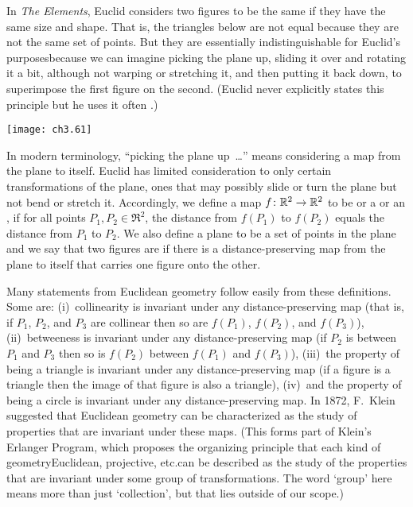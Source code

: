 In \emph{The Elements}, Euclid considers two figures to be
the same if they have the same size and shape.
That is, the triangles below are not equal because they are not the same 
set of points.
But they are \Dash essentially 
indistinguishable
for Euclid's purposes\Dash because we can imagine 
picking the plane up,
sliding it over and rotating it a bit,
although not warping or stretching it,    
and then putting it back down, to superimpose the first figure on
the second.
(Euclid never explicitly states this principle 
but he uses it often \cite{Casey}.)
\begin{center}
  \texttt{[image: ch3.61]}
\end{center}
In modern terminology, ``picking the plane up~\ldots'' 
means considering a
map from the plane to itself. 
Euclid has limited consideration to only certain 
transformations of the plane, ones
that may possibly slide or turn the plane but not bend or stretch it.
Accordingly, we define a map $\mbox{$f\colon \mathbb{R}^2\to \mathbb{R}^2$}$ to be 
%
or a  or an
,
if for all points $P_1,P_2\in\Re^2$,
the distance from $f(P_1)$ to $f(P_2)$ equals the distance from
$P_1$ to $P_2$. 
We also define a plane  
to be a set of points in the plane
and we say that two figures are 
%
 if there is a 
distance-preserving map from the plane to itself that carries one figure 
onto the other.

Many statements from Euclidean geometry 
follow easily from these definitions.
Some are: (i)~collinearity is invariant under any distance-preserving map
(that is, if $P_1$, $P_2$, and $P_3$ are collinear then so are
$f(P_1)$, $f(P_2)$, and $f(P_3)$),
(ii)~betweeness is invariant under any distance-preserving map
(if $P_2$ is between $P_1$ and $P_3$ then so is
$f(P_2)$ between $f(P_1)$ and $f(P_3)$),
(iii)~the property of being a triangle is invariant under 
any distance-preserving map 
(if a figure is a triangle then the image of that figure is also a triangle),
(iv)~and the property of being a circle is invariant under any
distance-preserving map.
In 1872, F.~Klein suggested that 
Euclidean geometry can be characterized as the study of properties that
are invariant under these maps.
(This forms part of Klein's Erlanger Program, 
which proposes the organizing principle that each kind of 
geometry\Dash Euclidean, projective, etc.\Dash can be described 
as the study of the properties that are
invariant under some group of transformations.
The word `group' here means more than just `collection', 
but that lies outside of our scope.)

